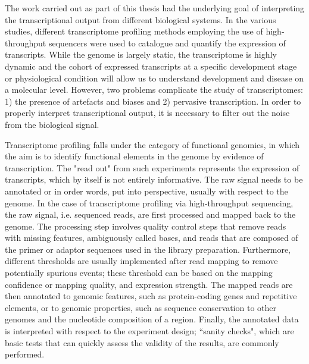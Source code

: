 The work carried out as part of this thesis had the underlying goal of interpreting the transcriptional output from different biological systems. In the various studies, different transcriptome profiling methods employing the use of high-throughput sequencers were used to catalogue and quantify the expression of transcripts. While the genome is largely static, the transcriptome is highly dynamic and the cohort of expressed transcripts at a specific development stage or physiological condition will allow us to understand development and disease on a molecular level. However, two problems complicate the study of transcriptomes: 1) the presence of artefacts and biases and 2) pervasive transcription. In order to properly interpret transcriptional output, it is necessary to filter out the noise from the biological signal.

Transcriptome profiling falls under the category of functional genomics, in which the aim is to identify functional elements in the genome by evidence of transcription. The "read out" from such experiments represents the expression of transcripts, which by itself is not entirely informative. The raw signal needs to be annotated or in order words, put into perspective, usually with respect to the genome. In the case of transcriptome profiling via high-throughput sequencing, the raw signal, i.e. sequenced reads, are first processed and mapped back to the genome. The processing step involves quality control steps that remove reads with missing features, ambiguously called bases, and reads that are composed of the primer or adaptor sequences used in the library preparation. Furthermore, different thresholds are usually implemented after read mapping to remove potentially spurious events; these threshold can be based on the mapping confidence or mapping quality, and expression strength. The mapped reads are then annotated to genomic features, such as protein-coding genes and repetitive elements, or to genomic properties, such as sequence conservation to other genomes and the nucleotide composition of a region. Finally, the annotated data is interpreted with respect to the experiment design; ``sanity checks", which are basic tests that can quickly assess the validity of the results, are commonly performed.

